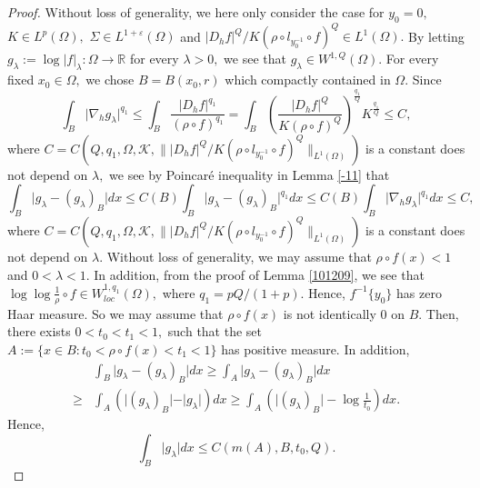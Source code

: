 \documentclass[10pt,a4paper]{amsart}
\begin{document}
\begin{proof}
Without loss of generality, we here only consider the case for $y_{0}=0,$ $K\in L^{p}(\Omega),$  $\Sigma\in L^{1+\varepsilon}(\Omega)$ and $\vert D_{h}f\vert^{Q}/K(\rho\circ l_{y_{0}^{-1}}\circ f)^{Q}\in L^{1}(\Omega).$ By letting $g_{\lambda}:=\log\vert f\vert_{\lambda}:\Omega\rightarrow\mathbb{R}$ for every $\lambda>0,$ we see that $g_{\lambda}\in W^{1,Q}(\Omega).$ For every fixed $x_{0}\in\Omega,$ we chose $B=B(x_{0},r)$ which compactly contained in $\Omega.$ Since 
\begin{equation}\label{1009982887}
\int_{B}\vert\nabla_{h}g_{\lambda}\vert^{q_{1}}\leq\int_{B}\frac{\vert D_{h}f\vert^{q_{1}}}{(\rho\circ f)^{q_{1}}}=\int_{B}\left(\frac{\vert D_{h}f\vert^{Q}}{K(\rho\circ f)^{Q}}\right)^{\frac{q_{1}}{Q}}K^{\frac{q_{1}}{Q}}\leq C,
\end{equation}
where $C=C(Q,q_{1},\Omega,\mathcal{K}, \| \vert D_{h}f\vert^{Q}/K(\rho\circ l_{y_{0}^{-1}}\circ f)^{Q}\|_{L^{1}(\Omega)})$ is a constant does not depend on $\lambda,$ we see by Poincar\'{e} inequality in Lemma \ref{-11}  that 
 $$\int_{B}\vert g_{\lambda}-(g_{\lambda})_{B}\vert dx
\leq C(B)\int_{B}\vert g_{\lambda}-(g_{\lambda})_{B}\vert^{q_{1}} dx\leq C(B)\int_{B}\vert \nabla_{h}g_{\lambda}\vert^{q_{1}} dx\leq C,$$
 where $C=C(Q,q_{1},\Omega,\mathcal{K}, \| \vert D_{h}f\vert^{Q}/K(\rho\circ l_{y_{0}^{-1}}\circ f)^{Q}\|_{L^{1}(\Omega)})$ is a constant does not depend on $\lambda.$ 
 Without loss of generality, we may assume that $\rho\circ f(x)<1$ and $0<\lambda<1.$ In addition, from the proof of Lemma  \ref{101209},  we see that $\log\log\frac{1}{\rho}\circ f\in W_{loc}^{1,q_{1}}(\Omega),$ where $q_{1}=pQ/(1+p).$ Hence, $f^{-1}\{y_{0}\}$ has zero Haar measure. So we may assume that $\rho\circ f(x)$ is not identically $0$ on $B.$ Then, there exists $0<t_{0}<t_{1}<1,$ such that the set $A:=\{x\in B:t_{0}<\rho\circ f(x)<t_{1}<1\}$ has positive  measure. In addition, 
 \begin{equation}
\begin{aligned}
&\int_{B}\vert g_{\lambda}-(g_{\lambda})_{B}\vert dx\geq\int_{A}\vert g_{\lambda}-(g_{\lambda})_{B}\vert dx\\
\geq&\int_{A}(\vert (g_{\lambda})_{B}\vert-\vert g_{\lambda}\vert )dx\geq\int_{A}(\vert (g_{\lambda})_{B}\vert-\log\frac{1}{t_{0}})dx.
\end{aligned}
\end{equation}
  Hence,
  \begin{equation}\label{0009j}
  \int_{B}\vert g_{\lambda}\vert dx\leq C(m(A),B,t_{0},Q).

\end{equation}
\end{proof}
\end{document}
